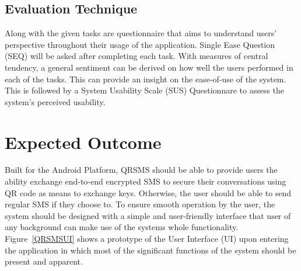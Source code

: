 \documentclass[journal]{./IEEE/IEEEtran}
\begin{document}
\subsection{Evaluation Technique}
Along with the given tasks are questionnaire that aims to understand users'
perspective throughout their usage of the application. Single Ease Question
(SEQ) will be asked after completing each task. With measures of central
tendency, a general sentiment can be derived on how well the users performed
in each of the tasks. This can provide an insight on the ease-of-use of the
system. This is followed by a System Usability Scale (SUS) Questionnare
to assess the system's perceived usability.

\section{Expected Outcome}
Built for the Android Platform, QRSMS should be able to provide
users the ability exchange end-to-end encrypted SMS to secure their
conversations using QR code as means to exchange keys.
Otherwise, the user should be able to send regular SMS if they choose to.
To ensure smooth operation by the user, the system should be designed
with a simple and user-friendly interface that user of any background
can make use of the systems whole functionality. Figure~\ref{QRSMSUI} shows a
prototype of the User Interface (UI) upon entering the application
in which most of the significant functions of the system should be present
and apparent.



%





\end{document}
